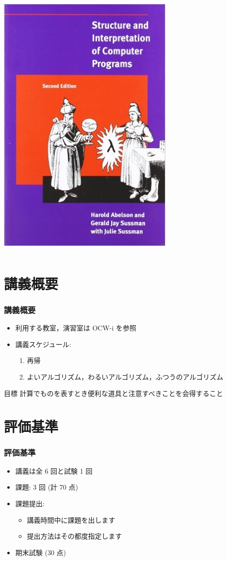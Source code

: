 \begin{frame}[shrink]
\begin{columns}[c]
\begin{column}{0.45\textwidth}
\includegraphics[scale=.25]{./Figure/SICP.jpg}
    \end{column}
  \end{columns}
\end{frame}
%
%
\section{講義概要}
\begin{frame}
\frametitle{講義概要}
  \begin{itemize}
\item 利用する教室，演習室は OCW-i を参照
\item 講義スケジュール:
    \begin{enumerate}
\item 再帰
\item よいアルゴリズム，わるいアルゴリズム，ふつうのアルゴリズム
    \end{enumerate}
  \end{itemize}
  \begin{block}{目標}
計算でものを表すとき便利な道具と注意すべきことを会得すること
  \end{block}
\end{frame}
%
%
\section{評価基準}
\begin{frame}
\frametitle{評価基準}
  \begin{itemize}
\item 講義は全 6 回と試験 1 回
\item 課題: 3 回 (計 70 点)
\item 課題提出: 
    \begin{itemize}
\item 講義時間中に課題を出します
\item 提出方法はその都度指定します
    \end{itemize}
\item 期末試験 (30 点)
  \end{itemize}
\end{frame}
